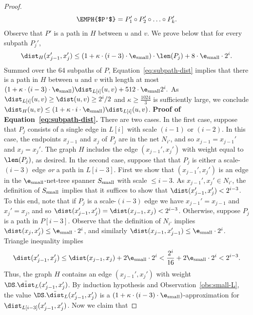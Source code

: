 \begin{proof}
\[\EMPH{$P'$} = P_1' \circ P_2' \circ \ldots \circ P_k'.\]
Observe that $P'$ is a path in $H$ between $u$ and $v$. We prove below that for every subpath $P_j'$,
\begin{equation}
\label{eq:subpath-dist}
    \dist_H(x_{j-1}',x_j') \le (1+\kappa\cdot(i-3)\cdot\e_{\rm small})\cdot \len(P_j) + 8 \cdot \e_{\rm small} \cdot 2^i.
\end{equation}
Summed over the 64 subpaths of $P$, Equation~\ref{eq:subpath-dist} implies that there is a path in $H$ between $u$ and $v$ with length at most 
\((1+\kappa \cdot (i-3) \cdot \e_{\rm small})\dist_{L[i]}(u,v) + 512 \cdot \e_{\rm small} 2^i.\)
As $\dist_{L[i]}(u,v) \ge \dist(u,v) \ge 2^i/2$ and $\kappa \ge \frac {1024} 3$ is sufficiently large, we conclude \(\dist_H(u,v) \le (1+\kappa \cdot i \cdot \e_{\rm small}) \dist_{L[i]}(u,v)\).
%
\medskip \noindent \textbf{Proof of Equation~\ref{eq:subpath-dist}.} There are two cases. In the first case, suppose that $P_j$ consists of a single edge in $L[i]$ with scale $(i-1)$ or $(i-2).$ In this case, the endpoints $x_{j-1}$ and $x_j$ of $P_j$ are in the net $N_{i'}$, and so $x_{j-1} = x_{j-1}'$ and $x_{j} = x_{j}'$. 
The graph $H$ includes the edge $(x_{j-1}',x_j')$ with weight equal to $\len(P_j)$, as desired.
%
In the second case, suppose that that $P_j$ is either a scale-$(i-3)$ edge \emph{or} a path in $L[i-3]$. 
First we show that $(x_{j-1}', x_j')$ is an edge in the $\e_{\rm small}$-net-tree spanner $S_{\rm small}$ with scale $\le i-3$.
As $x_{j-1}',x_j' \in N_{i'}$, the definition of $S_{\rm small}$ implies that it suffices to show that $\dist(x_{j-1}', x_j') < 2^{i-3}$.
To this end, note that if $P_j$ is a scale-$(i-3)$ edge we have $x_{j-1}' = x_{j-1}$ and $x_{j}'=x_j$, and so $\dist(x_{j-1}', x_{j}') = \dist(x_{j-1}, x_j) < 2^{i-3}$. Otherwise, suppose $P_j$ is a path in $P[i-3]$. Observe that the definition of $N_{i'}$ implies $\dist(x_{j},x_{j}') \le \e_{\rm small} \cdot 2^i$, and similarly $\dist(x_{j-1},x_{j-1}') \le \e_{\rm small} \cdot 2^i$. Triangle inequality implies
\[\dist(x_{j-1}', x_j') \le \dist(x_{j-1},x_j) + 2 \e_{\rm small}\cdot 2^i < \frac{2^i}{16} + 2 \e_{\rm small}\cdot 2^i < 2^{i-3}.\]
% 
Thus, the graph $H$ contains an edge $(x_{j-1}', x_j')$ with weight $\DS.\tilde \dist_L(x_{j-1}',x_j')$. By induction hypothesis and Observation~\ref{obs:small-L}, the value $\DS.\tilde \dist_L(x_{j-1}',x_j')$ is a $(1+\kappa\cdot(i-3)\cdot\e_{\rm small})$-approximation for $\dist_{L[i-3]}(x_{j-1}', x_j')$.
Now we claim that

\end{proof}
